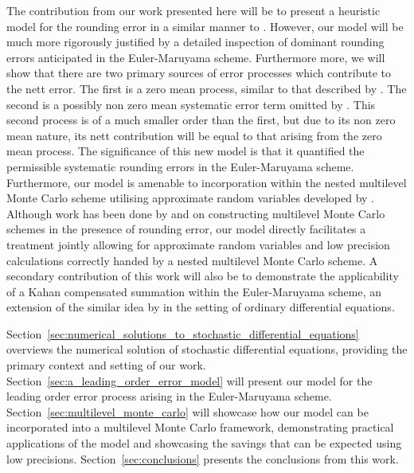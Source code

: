 \documentclass[manuscript,review]{acmart}
\begin{document}
The contribution from our work presented here will be to present a heuristic model for the rounding error in a similar manner to \citet{arciniega2003rounding}. However, our model will be much more rigorously justified by a detailed inspection of dominant rounding errors anticipated in the Euler-Maruyama scheme. Furthermore more, we will show that there are two primary sources of error processes which contribute to the nett error. The first is a zero mean process, similar to that described by \citet{arciniega2003rounding}. The second is a possibly non zero mean systematic error term omitted by \citet{arciniega2003rounding}. This second process is of a much smaller order than the first, but due to its non zero mean nature, its nett contribution will be equal to that arising from the zero mean process. The significance of this new model is that it quantified the permissible systematic rounding errors in the Euler-Maruyama scheme. Furthermore, our model is amenable to incorporation within the nested multilevel Monte Carlo scheme utilising approximate random variables developed by \citeauthor{giles2020approximate} \citep{giles2020approximate,sheridan2020approximate_inverse,sheridan2020approximate_random,sheridan2020nested}. Although work has been done by \citet{brugger2014mixed} and \citet{omland2015exploiting} on constructing multilevel Monte Carlo schemes in the presence of rounding error, our model directly facilitates a treatment jointly allowing for approximate random variables and low precision calculations correctly handed by a nested multilevel Monte Carlo scheme. A secondary contribution of this work will also be to demonstrate the applicability of a Kahan compensated summation within the Euler-Maruyama scheme, an extension of the similar idea by \citet{vitasek1969numerical} in the setting of ordinary differential equations. 

Section~\ref{sec:numerical_solutions_to_stochastic_differential_equations} overviews the numerical solution of stochastic differential equations, providing the primary context and setting of our work. Section~\ref{sec:a_leading_order_error_model} will present our model for the leading order error process arising in the Euler-Maruyama scheme. Section~\ref{sec:multilevel_monte_carlo} will showcase how our model can be incorporated into a multilevel Monte Carlo framework, demonstrating practical applications of the model and showcasing the savings that can be expected using low precisions. Section~\ref{sec:conclusions} presents the conclusions from this work. 
\end{document}
